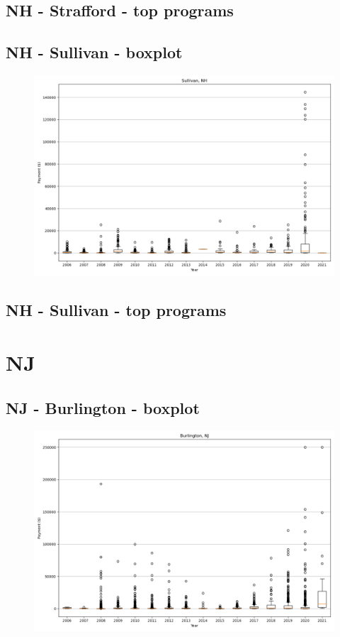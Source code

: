 \subsection*{NH - Strafford - top programs}

\newpage
\subsection*{NH - Sullivan - boxplot}
\begin{figure}[h]
\centering
\includegraphics[width=7in]{../output/boxplots/counties/Sullivan-NH_boxplot.png}
\end{figure}


\subsection*{NH - Sullivan - top programs}

\newpage
\section*{NJ}
\subsection*{NJ - Burlington - boxplot}
\begin{figure}[h]
\centering
\includegraphics[width=7in]{../output/boxplots/counties/Burlington-NJ_boxplot.png}
\end{figure}


